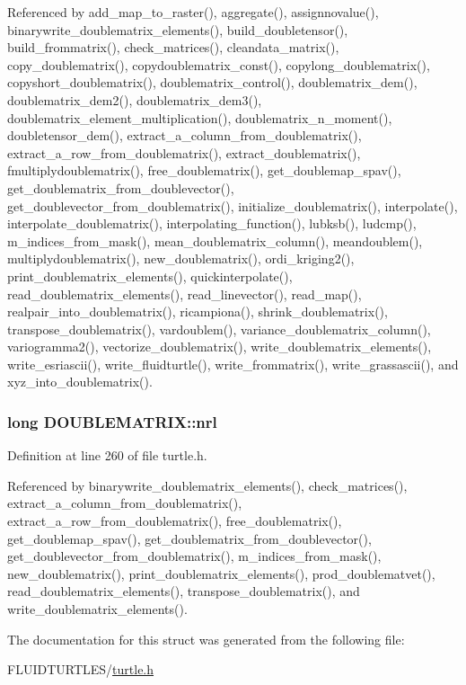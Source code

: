 Referenced by add\-\_\-map\-\_\-to\-\_\-raster(), aggregate(), assignnovalue(), binarywrite\-\_\-doublematrix\-\_\-elements(), build\-\_\-doubletensor(), build\-\_\-frommatrix(), check\-\_\-matrices(), cleandata\-\_\-matrix(), copy\-\_\-doublematrix(), copydoublematrix\-\_\-const(), copylong\-\_\-doublematrix(), copyshort\-\_\-doublematrix(), doublematrix\-\_\-control(), doublematrix\-\_\-dem(), doublematrix\-\_\-dem2(), doublematrix\-\_\-dem3(), doublematrix\-\_\-element\-\_\-multiplication(), doublematrix\-\_\-n\-\_\-moment(), doubletensor\-\_\-dem(), extract\-\_\-a\-\_\-column\-\_\-from\-\_\-doublematrix(), extract\-\_\-a\-\_\-row\-\_\-from\-\_\-doublematrix(), extract\-\_\-doublematrix(), fmultiplydoublematrix(), free\-\_\-doublematrix(), get\-\_\-doublemap\-\_\-spav(), get\-\_\-doublematrix\-\_\-from\-\_\-doublevector(), get\-\_\-doublevector\-\_\-from\-\_\-doublematrix(), initialize\-\_\-doublematrix(), interpolate(), interpolate\-\_\-doublematrix(), interpolating\-\_\-function(), lubksb(), ludcmp(), m\-\_\-indices\-\_\-from\-\_\-mask(), mean\-\_\-doublematrix\-\_\-column(), meandoublem(), multiplydoublematrix(), new\-\_\-doublematrix(), ordi\-\_\-kriging2(), print\-\_\-doublematrix\-\_\-elements(), quickinterpolate(), read\-\_\-doublematrix\-\_\-elements(), read\-\_\-linevector(), read\-\_\-map(), realpair\-\_\-into\-\_\-doublematrix(), ricampiona(), shrink\-\_\-doublematrix(), transpose\-\_\-doublematrix(), vardoublem(), variance\-\_\-doublematrix\-\_\-column(), variogramma2(), vectorize\-\_\-doublematrix(), write\-\_\-doublematrix\-\_\-elements(), write\-\_\-esriascii(), write\-\_\-fluidturtle(), write\-\_\-frommatrix(), write\-\_\-grassascii(), and xyz\-\_\-into\-\_\-doublematrix().

\hypertarget{struct_d_o_u_b_l_e_m_a_t_r_i_x_a6f4071b0e6af474b928d8e688027f1fb}{
\subsubsection[{nrl}]{\setlength{\rightskip}{0pt plus 5cm}long D\-O\-U\-B\-L\-E\-M\-A\-T\-R\-I\-X\-::nrl}}\label{struct_d_o_u_b_l_e_m_a_t_r_i_x_a6f4071b0e6af474b928d8e688027f1fb}


Definition at line 260 of file turtle.\-h.



Referenced by binarywrite\-\_\-doublematrix\-\_\-elements(), check\-\_\-matrices(), extract\-\_\-a\-\_\-column\-\_\-from\-\_\-doublematrix(), extract\-\_\-a\-\_\-row\-\_\-from\-\_\-doublematrix(), free\-\_\-doublematrix(), get\-\_\-doublemap\-\_\-spav(), get\-\_\-doublematrix\-\_\-from\-\_\-doublevector(), get\-\_\-doublevector\-\_\-from\-\_\-doublematrix(), m\-\_\-indices\-\_\-from\-\_\-mask(), new\-\_\-doublematrix(), print\-\_\-doublematrix\-\_\-elements(), prod\-\_\-doublematvet(), read\-\_\-doublematrix\-\_\-elements(), transpose\-\_\-doublematrix(), and write\-\_\-doublematrix\-\_\-elements().



The documentation for this struct was generated from the following file\-:\begin{DoxyCompactItemize}
\item 
F\-L\-U\-I\-D\-T\-U\-R\-T\-L\-E\-S/\hyperlink{turtle_8h}{turtle.\-h}\end{DoxyCompactItemize}
